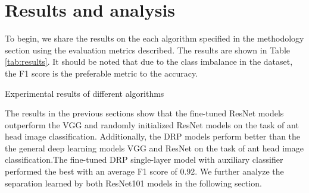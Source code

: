\documentclass{aci}
\numberwithin{equation}{section}
\begin{document}
\section{Results and analysis}


To begin, we share the results on the each algorithm specified in the
methodology section using the evaluation metrics described. The results are
shown in Table \ref{tab:results}. It should be noted that due to the class
imbalance in the dataset, the F1 score is the preferable metric to the accuracy.

\begin{table}[h]
    \centering
    \caption{Experimental results of different algorithms}
    
    \label{tab:results}
\end{table}

\FloatBarrier
The results in the previous sections show that the fine-tuned ResNet models
outperform the VGG and randomly initialized ResNet models on the task of ant
head image classification. Additionally, the DRP models perform better than the
the general deep learning models VGG and ResNet on the task of ant head image
classification.The fine-tuned DRP single-layer model with auxiliary classifier
performed the best with an average F1 score of 0.92. We further analyze the
separation learned by both ResNet101 models in the following section.



\end{document}
